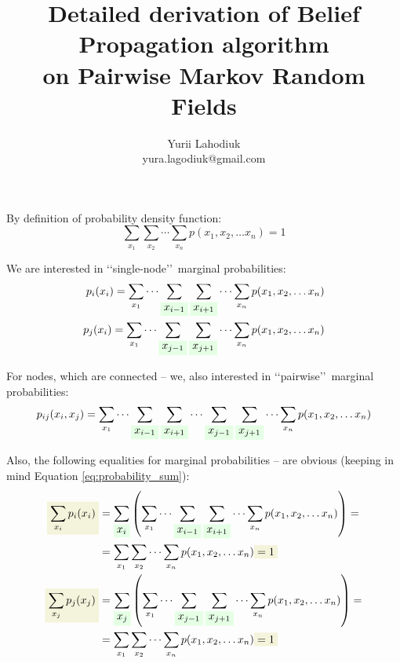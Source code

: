 \documentclass[fleqn,leqno]{article}
\newcommand{\highlight}[1]{\colorbox{green!10}{$\displaystyle#1$}}
\newcommand{\highlightred}[1]{\colorbox{olive!10}{$\displaystyle#1$}}
\begin{document}
\title{Detailed derivation of Belief Propagation algorithm \\ on Pairwise Markov Random Fields}
\author{Yurii Lahodiuk \\ yura.lagodiuk@gmail.com}
\date{}
\maketitle

By definition of probability density function:
\begin{equation} \label{eq:probability_sum}
\sum_{x_1} \sum_{x_2} \cdots \sum_{x_n}  p(x_1, x_2, \dots x_n) = 1
\end{equation}

We are interested in \lq \lq single-node\rq \rq\ marginal probabilities:
\begin{equation} \label{eq:marginal_probabilities_one_node}
\begin{split}
p_i(x_i) = \sum_{x_1} \cdots \sum_{ \highlight{ x_{i - 1} } } \sum_{ \highlight{ x_{i + 1} } } \cdots \sum_{x_n} p(x_1, x_2, \dots x_n) \\
p_j(x_i) = \sum_{x_1} \cdots \sum_{ \highlight{ x_{j - 1} } } \sum_{ \highlight{ x_{j + 1} } } \cdots \sum_{x_n} p(x_1, x_2, \dots x_n) \\
\end{split}
\end{equation}

For nodes, which are connected -- we, also interested in \lq \lq pairwise\rq \rq\ marginal probabilities:
\begin{equation} \label{eq:marginal_probabilities_two_nodes}
\begin{split}
p_{ij}(x_i, x_j) = \sum_{x_1} \cdots \sum_{ \highlight{ x_{i - 1} } } \sum_{ \highlight{ x_{i + 1} } } \cdots \sum_{ \highlight{ x_{j - 1} } } \sum_{ \highlight{ x_{j + 1} } } \cdots \sum_{x_n} p(x_1, x_2, \dots x_n)
\end{split}
\end{equation}

Also, the following equalities for marginal probabilities -- are obvious (keeping in mind Equation \eqref{eq:probability_sum}):
\begin{equation} \label{eq:sum_over_states_of_one_node_marginal_probabilities}
\begin{split}
\highlightred{ \sum_{x_i} p_i(x_i) } & =  \sum_{ \highlight{ x_i } } \left( \sum_{x_1} \cdots \sum_{ \highlight{ x_{i - 1} } } \sum_{ \highlight{ x_{i + 1} } } \cdots \sum_{x_n} p(x_1, x_2, \dots x_n) \right) = \\
                               & = \sum_{x_1} \sum_{x_2} \cdots \sum_{x_n}  p(x_1, x_2, \dots x_n) \highlightred{ = 1 } \\
\highlightred{ \sum_{x_j} p_j(x_j) } & = \sum_{ \highlight{ x_j } } \left( \sum_{x_1} \cdots \sum_{ \highlight{ x_{j - 1} } } \sum_{ \highlight{ x_{j + 1} } } \cdots \sum_{x_n} p(x_1, x_2, \dots x_n) \right) = \\
                               & = \sum_{x_1} \sum_{x_2} \cdots \sum_{x_n}  p(x_1, x_2, \dots x_n) \highlightred{ = 1 }
\end{split}
\end{equation}
\end{document}
